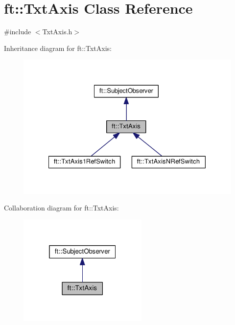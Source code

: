 \hypertarget{classft_1_1_txt_axis}{}\section{ft\+:\+:Txt\+Axis Class Reference}
\label{classft_1_1_txt_axis}


{\ttfamily \#include $<$Txt\+Axis.\+h$>$}



Inheritance diagram for ft\+:\+:Txt\+Axis\+:
\nopagebreak
\begin{figure}[H]
\begin{center}
\leavevmode
\includegraphics[width=328pt]{classft_1_1_txt_axis__inherit__graph}
\end{center}
\end{figure}


Collaboration diagram for ft\+:\+:Txt\+Axis\+:
\nopagebreak
\begin{figure}[H]
\begin{center}
\leavevmode
\includegraphics[width=181pt]{classft_1_1_txt_axis__coll__graph}
\end{center}
\end{figure}

